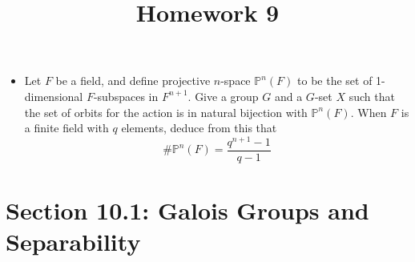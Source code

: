 \documentclass{article}
\newcommand{\PP}{\mathbb P}
\begin{document}
\title{Homework 9}
\maketitle
\thispagestyle{fancy}

\begin{itemize}
	\item Let $F$ be a field, and define projective $n$-space $\PP^n(F)$ to be the set of 1-dimensional $F$-subspaces in $F^{n+1}.$ Give a group $G$ and a $G$-set $X$ such that the set of orbits for the action is in natural bijection with $\PP^n(F).$ When $F$ is a finite field with $q$ elements, deduce from this that
		\[\# \PP^n(F)=\frac{q^{n+1}-1}{q-1}\] 
		
\end{itemize}

\section*{Section 10.1: Galois Groups and Separability}
\end{document}
